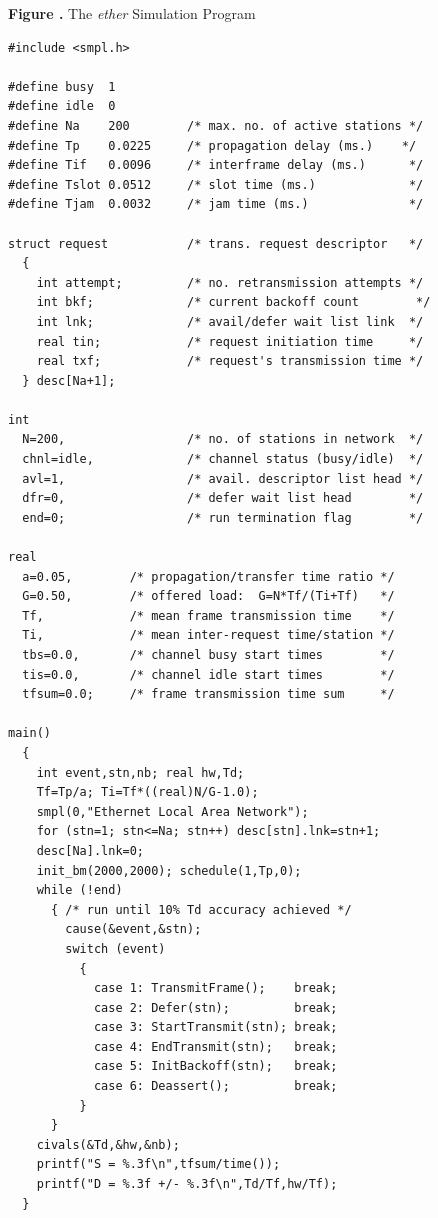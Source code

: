 \begin{center}\textbf{Figure \thefigure.} The \emph{ether} Simulation Program\end{center}
\begin{verbatim}
#include <smpl.h>

#define busy  1
#define idle  0
#define Na    200        /* max. no. of active stations */
#define Tp    0.0225     /* propagation delay (ms.)    */
#define Tif   0.0096     /* interframe delay (ms.)      */
#define Tslot 0.0512     /* slot time (ms.)             */
#define Tjam  0.0032     /* jam time (ms.)              */

struct request           /* trans. request descriptor   */
  {
    int attempt;         /* no. retransmission attempts */
    int bkf;             /* current backoff count        */
    int lnk;             /* avail/defer wait list link  */
    real tin;            /* request initiation time     */
    real txf;            /* request's transmission time */
  } desc[Na+1];

int
  N=200,                 /* no. of stations in network  */
  chnl=idle,             /* channel status (busy/idle)  */
  avl=1,                 /* avail. descriptor list head */
  dfr=0,                 /* defer wait list head        */
  end=0;                 /* run termination flag        */

real
  a=0.05,        /* propagation/transfer time ratio */
  G=0.50,        /* offered load:  G=N*Tf/(Ti+Tf)   */
  Tf,            /* mean frame transmission time    */
  Ti,            /* mean inter-request time/station */
  tbs=0.0,       /* channel busy start times        */
  tis=0.0,       /* channel idle start times        */
  tfsum=0.0;     /* frame transmission time sum     */

main()
  {
    int event,stn,nb; real hw,Td;
    Tf=Tp/a; Ti=Tf*((real)N/G-1.0);
    smpl(0,"Ethernet Local Area Network");
    for (stn=1; stn<=Na; stn++) desc[stn].lnk=stn+1;
    desc[Na].lnk=0;
    init_bm(2000,2000); schedule(1,Tp,0);
    while (!end)
      { /* run until 10% Td accuracy achieved */
        cause(&event,&stn);
        switch (event)
          {
            case 1: TransmitFrame();    break;
            case 2: Defer(stn);         break;
            case 3: StartTransmit(stn); break;
            case 4: EndTransmit(stn);   break;
            case 5: InitBackoff(stn);   break;
            case 6: Deassert();         break;
          }
      }
    civals(&Td,&hw,&nb);
    printf("S = %.3f\n",tfsum/time());
    printf("D = %.3f +/- %.3f\n",Td/Tf,hw/Tf);
  }


\end{verbatim}
